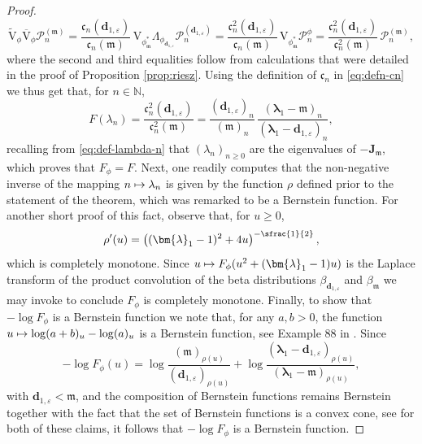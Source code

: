 \documentclass[10pt]{amsart}
\let\epsilon\varepsilon
\newcommand\mto{\mathchoice{\longmapsto}{\mapsto}{\mapsto}{\mapsto}}
\theoremstyle{plain}
\theoremstyle{definition}
\newcommand{\N}{\mathbb{N}}
\renewcommand{\P}{\mathcal{P}}
\newcommand{\calJd}{\mathbf{J}}
\newcommand{\m}{\mathfrak{m}}
\newcommand{\dz}{{\bm{d}}_{1,\epsilon}}
\newcommand{\lam}{{\bm{\lambda}_1}}
\newcommand{\phm}{{\phi_\m^*}}
\newcommand{\gab}[1][\lam,\mo]{{\beta_{#1}}}
\let\mo\mu
\begin{document}
\begin{proof}
\begin{equation*}
\widetilde{\mathrm{V}}_{\phi}\overline{\mathrm{V}}_{\phi} \P_n^{(\m)} = \frac{\mathfrak{c}_n(\dz)}{\mathfrak{c}_n(\m)}\, \mathrm{V}_{\phm} \Lambda_{\phi_{\dz}} \P_n^{(\dz)} = \frac{\mathfrak{c}_n^2(\dz)}{\mathfrak{c}_n(\m)}\, \mathrm{V}_{\phm} \P_n^\phi = \frac{\mathfrak{c}_n^2(\dz)}{\mathfrak{c}_n^2(\m)}\, \P_n^{(\m)},
\end{equation*}
where the second and third equalities follow from calculations that were detailed in the proof of Proposition \ref{prop:riesz}. Using the definition of $\mathfrak{c}_n$ in \eqref{eq:defn-cn} we thus get that, for $n \in \N$,
\begin{equation*}
F(\lambda_n) = \frac{\mathfrak{c}_n^2(\dz)}{\mathfrak{c}_n^2(\m)} = \frac{(\dz)_n}{(\m)_n}\, \frac{(\lam-\m)_n}{(\lam-\dz)_n},
\end{equation*}
recalling from \eqref{eq:def-lambda-n} that $(\lambda_n)_{n \geq 0}$ are the eigenvalues of $-\calJd_{\m}$, which proves that $F_\phi = F$. Next, one readily computes that the non-negative inverse of the mapping $n \mto \lambda_n$ is given by the function $\rho$ defined prior to the statement of the theorem, which was remarked to be a Bernstein function. For another short proof of this fact, observe that, for $u \geq 0$,
\begin{equation*}
\rho'(u) = \left((\lam-1)^2+4u\right)^{-\sfrac{1}{2}},
\end{equation*}
which is completely monotone. Since $u \mto F_\phi(u^2+(\lam-1)u)$ is the Laplace transform of the product convolution of the beta distributions $\gab[\dz]$ and $\gab[\m]$ we may invoke \cite[Th.\,3.7]{SchillingSongVondracek10} to conclude $F_\phi$ is completely monotone. Finally, to show that $-\log F_\phi$ is a Bernstein function we note that, for any $a, b > 0$, the function $u \mto \log (a+b)_u - \log (a)_u$ is a Bernstein function, see \eg Example 88 in \cite[Chap.\,16]{SchillingSongVondracek10}. Since
\begin{equation*}
-\log F_\phi(u) = \log \frac{(\m)_{\rho(u)}}{(\dz)_{\rho(u)}} + \log \frac{(\lam-\dz)_{\rho(u)}}{(\lam-\m)_{\rho(u)}},
\end{equation*}
with $\dz < \m$, and the composition of Bernstein functions remains Bernstein together with the fact that the set of Bernstein functions is a convex cone, see \eg \cite[Cor.\,3.8]{SchillingSongVondracek10} for both of these claims, it follows that $-\log F_\phi$ is a Bernstein function.
\end{proof}
\end{document}
